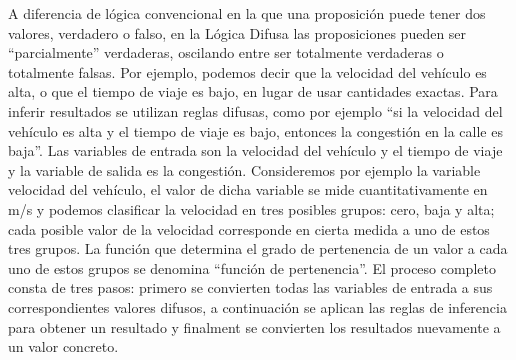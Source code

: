 A diferencia de lógica convencional en la que una proposición puede tener dos valores, verdadero o falso, en la Lógica Difusa las proposiciones pueden ser “parcialmente” verdaderas, oscilando entre ser totalmente verdaderas o totalmente falsas. Por ejemplo, podemos decir que la velocidad del vehículo es alta, o que el tiempo de viaje es bajo, en lugar de usar cantidades exactas. Para inferir resultados se utilizan reglas difusas, como por ejemplo “si la velocidad del vehículo es alta y el tiempo de viaje es bajo, entonces la congestión en la calle es baja”. Las variables de entrada son la velocidad del vehículo y el tiempo de viaje y la variable de salida es la congestión. Consideremos por ejemplo la variable velocidad del vehículo, el valor de dicha variable se mide cuantitativamente en m/s y podemos clasificar la velocidad en tres posibles grupos: cero, baja y alta; cada posible valor de la velocidad corresponde en cierta medida a uno de estos tres grupos. La función  que determina el grado de pertenencia de un valor a cada uno de estos grupos se denomina “función de pertenencia”. El proceso completo consta de tres pasos: primero se convierten todas las variables de entrada a sus correspondientes valores difusos, a continuación se aplican las reglas de inferencia para obtener un resultado y finalment se convierten los resultados nuevamente a un valor concreto.

